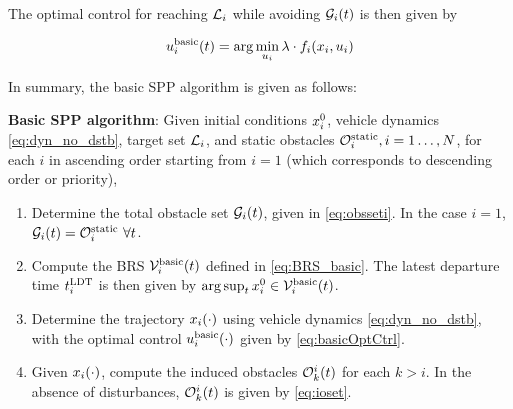 The optimal control for reaching $\mathcal{L}_i$ while avoiding $\mathcal{G}_i(t)$ is then given by

\begin{equation}
\label{eq:basicOptCtrl}
\ctrl_i^\text{basic}(t) = \arg \min_{\ctrl_i} \costate \cdot \fdyn_i(\state_i, \ctrl_i)
\end{equation}

In summary, the basic SPP algorithm is given as follows:

\begin{alg}
\label{alg:basic}
\textbf{Basic SPP algorithm}: Given initial conditions $x_i^0$, vehicle dynamics \eqref{eq:dyn_no_dstb}, target set $\mathcal{L}_i$, and static obstacles $\mathcal{O}^\text{static}_i, i = 1\ldots, N$, for each $i$ in ascending order starting from $i=1$ (which corresponds to descending order or priority),
\begin{enumerate}
\item Determine the total obstacle set $\mathcal{G}_i(t)$, given in \eqref{eq:obsseti}. In the case $i=1$, $\mathcal{G}_i(t) = \mathcal{O}^\text{static}_i ~ \forall t$.
\item Compute the BRS $\mathcal{V}_i^\text{basic}(t)$ defined in \eqref{eq:BRS_basic}. The latest departure time $t^\text{LDT}_i$ is then given by $\arg \sup_t x^0_i \in \mathcal{V}_i^\text{basic}(t)$.
\item Determine the trajectory $x_i(\cdot)$ using vehicle dynamics \eqref{eq:dyn_no_dstb}, with the optimal control  $u_i^\text{basic}(\cdot)$ given by \eqref{eq:basicOptCtrl}.
\item Given $x_i(\cdot)$, compute the induced obstacles $\mathcal{O}_k^i(t)$ for each $k>i$. In the absence of disturbances, $\mathcal{O}_k^i(t)$ is given by \eqref{eq:ioset}.
\end{enumerate}
\end{alg}